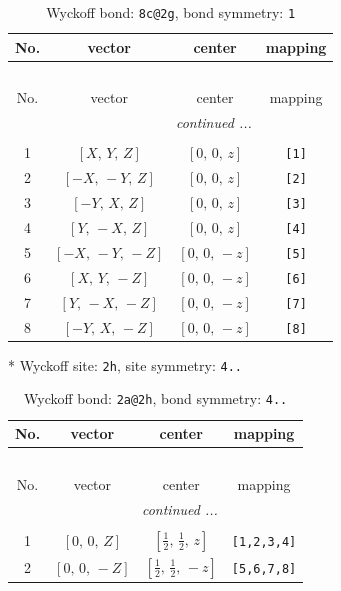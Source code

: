 \documentclass[fleqn,8pt]{jsarticle}
\begin{document}
\renewcommand{\arraystretch}{1.2}
\begin{longtable}{cccc}
\caption{Wyckoff bond: {\tt 8c@2g}, bond symmetry: {\tt 1}}
 \\
 \hline \hline
No. & vector & center & mapping \\ \hline \endfirsthead

\multicolumn{3}{l}{\tablename\ \thetable{}} \\
 \hline \hline
No. & vector & center & mapping \\ \hline \endhead

 \hline \hline
\multicolumn{3}{r}{\footnotesize\it continued ...} \\ \endfoot

 \hline \hline
\multicolumn{3}{r}{} \\ \endlastfoot

1 & $\left[ X,\, Y,\, Z \right]$ & $\left[ 0,\, 0,\, z \right]$ & {\tt [1]} \\ \hline
2 & $\left[ - X,\, - Y,\, Z \right]$ & $\left[ 0,\, 0,\, z \right]$ & {\tt [2]} \\ \hline
3 & $\left[ - Y,\, X,\, Z \right]$ & $\left[ 0,\, 0,\, z \right]$ & {\tt [3]} \\ \hline
4 & $\left[ Y,\, - X,\, Z \right]$ & $\left[ 0,\, 0,\, z \right]$ & {\tt [4]} \\ \hline
5 & $\left[ - X,\, - Y,\, - Z \right]$ & $\left[ 0,\, 0,\, - z \right]$ & {\tt [5]} \\ \hline
6 & $\left[ X,\, Y,\, - Z \right]$ & $\left[ 0,\, 0,\, - z \right]$ & {\tt [6]} \\ \hline
7 & $\left[ Y,\, - X,\, - Z \right]$ & $\left[ 0,\, 0,\, - z \right]$ & {\tt [7]} \\ \hline
8 & $\left[ - Y,\, X,\, - Z \right]$ & $\left[ 0,\, 0,\, - z \right]$ & {\tt [8]} \\
\end{longtable}
* Wyckoff site: {\tt 2h}, site symmetry: {\tt 4..}
\renewcommand{\arraystretch}{1.2}
\begin{longtable}{cccc}
\caption{Wyckoff bond: {\tt 2a@2h}, bond symmetry: {\tt 4..}}
 \\
 \hline \hline
No. & vector & center & mapping \\ \hline \endfirsthead

\multicolumn{3}{l}{\tablename\ \thetable{}} \\
 \hline \hline
No. & vector & center & mapping \\ \hline \endhead

 \hline \hline
\multicolumn{3}{r}{\footnotesize\it continued ...} \\ \endfoot

 \hline \hline
\multicolumn{3}{r}{} \\ \endlastfoot

1 & $\left[ 0,\, 0,\, Z \right]$ & $\left[ \frac{1}{2},\, \frac{1}{2},\, z \right]$ & {\tt [1,2,3,4]} \\ \hline
2 & $\left[ 0,\, 0,\, - Z \right]$ & $\left[ \frac{1}{2},\, \frac{1}{2},\, - z \right]$ & {\tt [5,6,7,8]} \\
\end{longtable}
\end{document}
